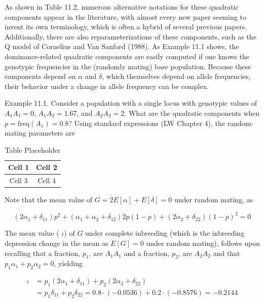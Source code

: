 \documentclass{article}
\begin{document}
As shown in Table 11.2, numerous alternative notations for these quadratic components appear in the literature, with almost every new paper seeming to invent its own terminology, which is often a hybrid of several previous papers. Additionally, there are also reparameterizations of these components, such as the Q model of Cornelius and Van Sanford (1988). As Example 11.1 shows, the dominance-related quadratic components are easily computed if one knows the genotypic frequencies in the (randomly mating) base population. Because these components depend on  $ \alpha $ and  $ \delta $, which themselves depend on allele frequencies, their behavior under a change in allele frequency can be complex.

Example 11.1. Consider a population with a single locus with genotypic values of  $ A_1A_1 = 0 $,  $ A_1A_2 = 1.67 $, and  $ A_2A_2 = 2 $. What are the quadratic components when  $ p = \text{freq}(A_1) = 0.8 $? Using standard expressions (LW Chapter 4), the random-mating parameters are

\begin{table}[h]
\centering
\begin{tabular}{|c|c|}
\hline
Cell 1 & Cell 2 \\
\hline
Cell 3 & Cell 4 \\
\hline
\end{tabular}
\caption{Table Placeholder}
\end{table}

Note that the mean value of  $ G = 2E[\alpha] + E[\delta] = 0 $ under random mating, as

\begin{equation}
(2\alpha_{1}+\delta_{11})p^{2}+(\alpha_{1}+\alpha_{2}+\delta_{12})2p(1-p)+(2\alpha_{2}+\delta_{22})(1-p)^{2}=0
\end{equation}

The mean value ( $ \iota $) of  $ G $ under complete inbreeding (which is the inbreeding depression change in the mean as  $ E[G] = 0 $ under random mating), follows upon recalling that a fraction,  $ p_1 $, are  $ A_1A_1 $ and a fraction,  $ p_2 $, are  $ A_2A_2 $ and that  $ p_1\alpha_1 + p_2\alpha_2 = 0 $, yielding

\begin{equation}
\begin{aligned}\iota&=p_{1}(2\alpha_{1}+\delta_{11})+p_{2}(2\alpha_{2}+\delta_{22})\\&=p_{1}\delta_{11}+p_{2}\delta_{22}=0.8\cdot(-0.0536)+0.2\cdot(-0.8576)=-0.2144\end{aligned}
\end{equation}
\end{document}
